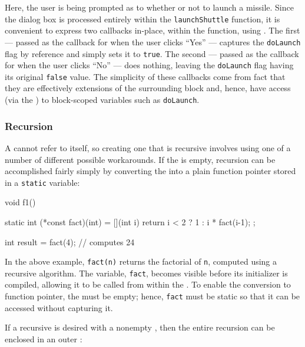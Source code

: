 Here, the user is being prompted as to whether or not to launch a
missile. Since the dialog box is processed entirely within the
\lstinline!launchShuttle! function, it is convenient to express two
callbacks in-place, within the function, using . The first  --- passed as the
callback for when the user clicks ``Yes'' --- captures the
\lstinline!doLaunch! flag by reference and simply sets it to \lstinline!true!.
The second  --- passed as the callback for
when the user clicks ``No'' --- does nothing, leaving the
\lstinline!doLaunch! flag having its original \lstinline!false! value. The
simplicity of these callbacks come from fact that they are effectively
extensions of the surrounding block and, hence, have access (via the
) to block-scoped variables such as
\lstinline!doLaunch!.

\subsubsection[Recursion]{Recursion}\label{recursion}

A  cannot refer to itself, so creating one
that is recursive involves using one of a number of different possible
workarounds. If the  is empty, recursion can be
accomplished fairly simply by converting the 
into a plain function pointer stored in a \lstinline!static! variable:

\begin{emcppslisting}
void f1()
{
    static int (*const fact)(int) = [](int i)
    {
        return i < 2 ? 1 : i * fact(i-1);
    };

    int result = fact(4);  // computes 24
}
\end{emcppslisting}
    

In the above example, \lstinline!fact(n)! returns the factorial of
\lstinline!n!, computed using a recursive algorithm. The variable,
\lstinline!fact!, becomes visible before its initializer is compiled,
allowing it to be called from within the . To
enable the conversion to function pointer, the 
must be empty; hence, \lstinline!fact! must be static so that it can be
accessed without capturing it.

If a recursive  is desired with a nonempty
, then the entire recursion can be enclosed in an
outer :

